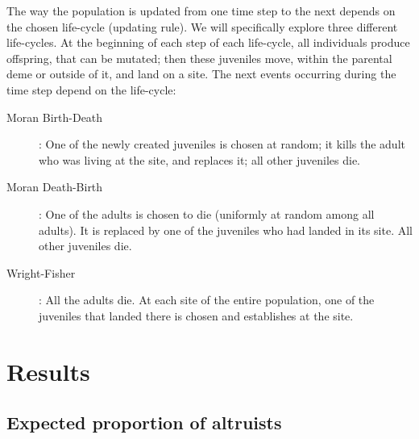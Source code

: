 \documentclass[11pt, letterpaper]{article}
\begin{document}
The way the population is updated from one time step to the next depends on the chosen life-cycle (updating rule). We will specifically explore three different life-cycles. At the beginning of each step of each life-cycle, all individuals produce offspring, that can be mutated; then these juveniles move, within the parental deme or outside of it, and land on a site. The next events occurring during the time step depend on the life-cycle:
\begin{description}
\item[Moran Birth-Death]: One of the newly created juveniles is chosen at random; it kills the adult who was living at the site, and replaces it; all other juveniles die. 
\item[Moran Death-Birth]: One of the adults is chosen to die (uniformly at random among all adults). It is replaced by one of the juveniles who had landed in its site. All other juveniles die. 
\item[Wright-Fisher]: All the adults die. At each site of the entire population, one of the juveniles that landed there is chosen and establishes at the site. 
\end{description}
  
\section{Results}

\subsection{Expected proportion of altruists}
\end{document}
